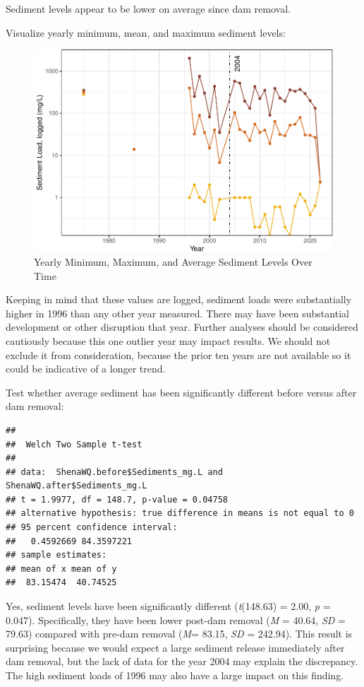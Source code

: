 \documentclass[
  12pt,
]{article}
\begin{document}
Sediment levels appear to be lower on average since dam removal.

Visualize yearly minimum, mean, and maximum sediment levels:

\begin{figure}
\centering
\includegraphics{Project_Script_files/figure-latex/Sediment_Analysis3-1.pdf}
\caption{Yearly Minimum, Maximum, and Average Sediment Levels Over Time}
\end{figure}

Keeping in mind that these values are logged, sediment loads were
substantially higher in 1996 than any other year measured. There may
have been substantial development or other disruption that year. Further
analyses should be considered cautiously because this one outlier year
may impact results. We should not exclude it from consideration, because
the prior ten years are not available so it could be indicative of a
longer trend.

Test whether average sediment has been significantly different before
versus after dam removal:

\begin{verbatim}
## 
##  Welch Two Sample t-test
## 
## data:  ShenaWQ.before$Sediments_mg.L and ShenaWQ.after$Sediments_mg.L
## t = 1.9977, df = 148.7, p-value = 0.04758
## alternative hypothesis: true difference in means is not equal to 0
## 95 percent confidence interval:
##   0.4592669 84.3597221
## sample estimates:
## mean of x mean of y 
##  83.15474  40.74525
\end{verbatim}

Yes, sediment levels have been significantly different (\emph{t}(148.63)
= 2.00, \emph{p} = 0.047). Specifically, they have been lower post-dam
removal (\emph{M} = 40.64, \emph{SD} = 79.63) compared with pre-dam
removal (\emph{M}= 83.15, \emph{SD} = 242.94). This result is surprising
because we would expect a large sediment release immediately after dam
removal, but the lack of data for the year 2004 may explain the
discrepancy. The high sediment loads of 1996 may also have a large
impact on this finding.
\end{document}

